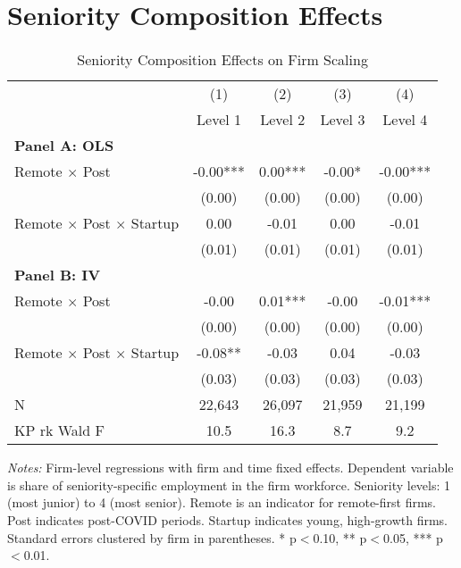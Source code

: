 \documentclass[11pt]{article}
\begin{document}
\section{Seniority Composition Effects}

\begin{table}[H]
\centering
\caption{Seniority Composition Effects on Firm Scaling}
\begin{threeparttable}
\begin{tabular}{lcccc}
\toprule
 & (1) & (2) & (3) & (4) \\
 & Level 1 & Level 2 & Level 3 & Level 4 \\
\midrule
\multicolumn{5}{l}{\textbf{Panel A: OLS}} \\
\addlinespace
Remote $\times$ Post & -0.00*** & 0.00*** & -0.00* & -0.00*** \\
  & (0.00) & (0.00) & (0.00) & (0.00) \\
\addlinespace[0.5em]
Remote $\times$ Post $\times$ Startup & 0.00 & -0.01 & 0.00 & -0.01 \\
  & (0.01) & (0.01) & (0.01) & (0.01) \\
\midrule
\multicolumn{5}{l}{\textbf{Panel B: IV}} \\
\addlinespace
Remote $\times$ Post & -0.00 & 0.01*** & -0.00 & -0.01*** \\
  & (0.00) & (0.00) & (0.00) & (0.00) \\
\addlinespace[0.5em]
Remote $\times$ Post $\times$ Startup & -0.08** & -0.03 & 0.04 & -0.03 \\
  & (0.03) & (0.03) & (0.03) & (0.03) \\
\midrule
N & 22,643 & 26,097 & 21,959 & 21,199 \\
KP rk Wald F & 10.5 & 16.3 & 8.7 & 9.2 \\
\bottomrule
\end{tabular}
\begin{tablenotes}
\small
\item \textit{Notes:} Firm-level regressions with firm and time fixed effects. 
Dependent variable is share of seniority-specific employment in the firm workforce. 
Seniority levels: 1 (most junior) to 4 (most senior).
Remote is an indicator for remote-first firms. Post indicates post-COVID periods.
Startup indicates young, high-growth firms.
Standard errors clustered by firm in parentheses. 
* p$<$0.10, ** p$<$0.05, *** p$<$0.01.
\end{tablenotes}
\end{threeparttable}
\end{table}
\end{document}
